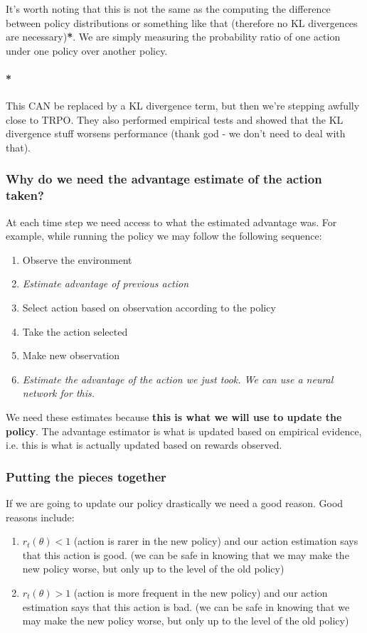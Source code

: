 \documentclass{article}
\begin{document}
It's worth noting that this is not the same as the computing the difference between policy distributions or something like that (therefore no KL divergences are necessary)\textbf{*}. We are simply measuring the probability ratio of one action under one policy over another policy.

\paragraph{*}This CAN be replaced by a KL divergence term, but then we're stepping awfully close to TRPO. They also performed empirical tests and showed that the KL divergence stuff worsens performance (thank god - we don't need to deal with that).

\subsubsection{Why do we need the advantage estimate of the action taken?}

At each time step we need access to what the estimated advantage was. For example, while running the policy we may follow the following sequence:
\begin{enumerate}
    \item Observe the environment
    \item \emph{Estimate advantage of previous action} 
    \item Select action based on observation according to the policy
    \item Take the action selected 
    \item Make new observation
    \item \emph{Estimate the advantage of the action we just took. We can use a neural network for this.}
\end{enumerate}

We need these estimates because \textbf{this is what we will use to update the policy}. The advantage estimator is what is updated based on empirical evidence, i.e. this is what is actually updated based on rewards observed.

\subsubsection{Putting the pieces together}

If we are going to update our policy drastically we need a good reason. Good reasons include:
\begin{enumerate}
    \item \(r_t(\theta) < 1 \) (action is rarer in the new policy) and our action estimation says that this action is good. (we can be safe in knowing that we may make the new policy worse, but only up to the level of the old policy)
    \item \(r_t(\theta) > 1 \) (action is more frequent in the new policy) and our action estimation says that this action is bad. (we can be safe in knowing that we may make the new policy worse, but only up to the level of the old policy)
\end{enumerate}
\end{document}
